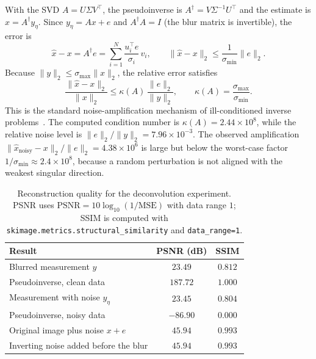 \documentclass[11pt,a4paper]{article}
\newcommand{\T}{\top}
\begin{document}
With the SVD $A=U\Sigma V^\T$, the pseudoinverse is $A^\dagger=V\Sigma^{-1}U^\T$ and the estimate
is $\hat{x}=A^\dagger y_\eta$. Since $y_\eta=Ax+e$ and $A^\dagger A=I$ (the blur matrix is
invertible), the error is
\begin{equation}
\hat{x}-x=A^\dagger e=\sum_{i=1}^{N}\frac{u_i^\T e}{\sigma_i}\,v_i ,
\qquad
\|\hat{x}-x\|_2\le\frac{1}{\sigma_{\min}}\|e\|_2 .
\label{eq:errorprop}
\end{equation}
Because $\|y\|_2\le\sigma_{\max}\|x\|_2$, the relative error satisfies
\begin{equation}
\frac{\|\hat{x}-x\|_2}{\|x\|_2}
\le \kappa(A)\,\frac{\|e\|_2}{\|y\|_2},
\qquad
\kappa(A)=\frac{\sigma_{\max}}{\sigma_{\min}} .
\label{eq:bound}
\end{equation}
This is the standard noise-amplification mechanism of ill-conditioned inverse
problems~\cite{hansen2010}. The computed condition number is $\kappa(A)=2.44\times10^{8}$, while the relative noise level is
$\|e\|_2/\|y\|_2=7.96\times10^{-3}$. The observed amplification
$\|\hat{x}_{\text{noisy}}-x\|_2/\|e\|_2=4.38\times10^{6}$ is large but below the worst-case
factor $1/\sigma_{\min}\approx2.4\times10^{8}$, because a random perturbation is not aligned with
the weakest singular direction.

\begin{table}[H]
\centering
\small
\begin{tabular}{lcc}
\toprule
Result & PSNR (dB) & SSIM\\
\midrule
Blurred measurement $y$                     & $23.49$  & $0.812$\\
Pseudoinverse, clean data                   & $187.72$ & $1.000$\\
Measurement with noise $y_\eta$             & $23.45$  & $0.804$\\
Pseudoinverse, noisy data                   & $-86.90$ & $0.000$\\
Original image plus noise $x+e$             & $45.94$  & $0.993$\\
Inverting noise added before the blur       & $45.94$  & $0.993$\\
\bottomrule
\end{tabular}
\caption{Reconstruction quality for the deconvolution experiment. PSNR uses
$\mathrm{PSNR}=10\log_{10}(1/\mathrm{MSE})$ with data range $1$; SSIM is computed with
\texttt{skimage.metrics.structural\_similarity} and \texttt{data\_range=1}.}
\label{tab:deconv}
\end{table}
\end{document}
